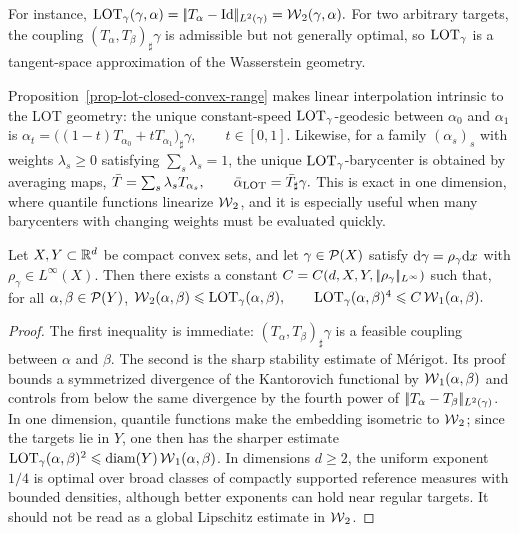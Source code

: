 For instance, \(\operatorname{LOT}_\gamma(\gamma,\alpha) = |\!| T_\alpha-\mathrm{Id} |\!|_{L^2(\gamma)} = \operatorname{\mathcal{W}}_2(\gamma,\alpha).\)
For two arbitrary targets, the coupling $(T_\alpha,T_\beta)_\sharp\gamma$ is admissible but not generally optimal, so $\operatorname{LOT}_\gamma$ is a tangent-space approximation of the Wasserstein geometry.

Proposition~\ref{prop-lot-closed-convex-range} makes linear interpolation intrinsic to the LOT geometry: the unique constant-speed $\operatorname{LOT}_\gamma$-geodesic between $\alpha_0$ and $\alpha_1$ is
\(\alpha_t=\big((1-t)T_{\alpha_0}+tT_{\alpha_1}\big)_\sharp\gamma, \qquad t\in[0,1].\)
Likewise, for a family $(\alpha_s)_s$ with weights $\lambda_s\geq0$ satisfying $\sum_s\lambda_s=1$, the unique $\operatorname{LOT}_\gamma$-barycenter is obtained by averaging maps,
\(\bar T=\sum_s\lambda_s T_{\alpha_s}, \qquad \bar\alpha_{\operatorname{LOT}}=\bar T_\sharp\gamma.\)
This is exact in one dimension, where quantile functions linearize $\operatorname{\mathcal{W}}_2$, and it is especially useful when many barycenters with changing weights must be evaluated quickly.

\begin{prop}\label{prop-linear-ot-stability}
Let $X,Y\subset\mathbb{R}^d$ be compact convex sets, and let $\gamma\in\mathcal{P}(X)$ satisfy $\mathrm{d}\gamma=\rho_\gamma\mathrm{d} x$ with $\rho_\gamma\in L^\infty(X)$. Then there exists a constant $C=C(d,X,Y,|\!| \rho_\gamma |\!|_{L^\infty})$ such that, for all $\alpha,\beta\in\mathcal{P}(Y)$,
\(\operatorname{\mathcal{W}}_2(\alpha,\beta)\leqslant \operatorname{LOT}_\gamma(\alpha,\beta), \qquad \operatorname{LOT}_\gamma(\alpha,\beta)^4 \leqslant C\operatorname{\mathcal{W}}_1(\alpha,\beta).\)
\end{prop}
\begin{proof}
The first inequality is immediate: $(T_\alpha,T_\beta)_\sharp\gamma$ is a feasible coupling between $\alpha$ and $\beta$. The second is the sharp stability estimate of M\'erigot. Its proof bounds a symmetrized divergence of the Kantorovich functional by $\operatorname{\mathcal{W}}_1(\alpha,\beta)$ and controls from below the same divergence by the fourth power of $|\!| T_\alpha-T_\beta |\!|_{L^2(\gamma)}$.
In one dimension, quantile functions make the embedding isometric to $\operatorname{\mathcal{W}}_2$; since the targets lie in $Y$, one then has the sharper estimate $\operatorname{LOT}_\gamma(\alpha,\beta)^2\leqslant\operatorname{diam}(Y)\operatorname{\mathcal{W}}_1(\alpha,\beta)$. In dimensions $d\geq2$, the uniform exponent $1/4$ is optimal over broad classes of compactly supported reference measures with bounded densities, although better exponents can hold near regular targets. It should not be read as a global Lipschitz estimate in $\operatorname{\mathcal{W}}_2$.
\end{proof}
